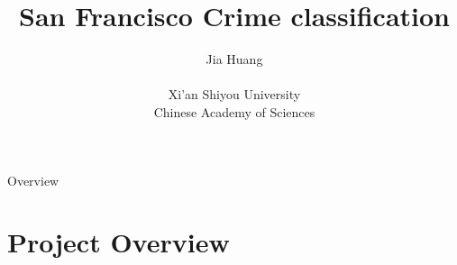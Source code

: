 \documentclass[
 size=14pt,
 paper=smartboard,  %
 mode=present, 		%
 display=slides, 	%
 style=tuliplab,  	%
 pauseslide,
 fleqn,leqno]{powerdot}
\title{San Francisco Crime classification}
\author{
Jia Huang
\\
\\Xi'an Shiyou University
\\Chinese Academy of Sciences
}
\begin{document}
\maketitle



\begin{slide}[toc=,bm=]{Overview}
\tableofcontents[content=currentsection,type=1]
\end{slide}


\section{Project Overview}
\end{document}
